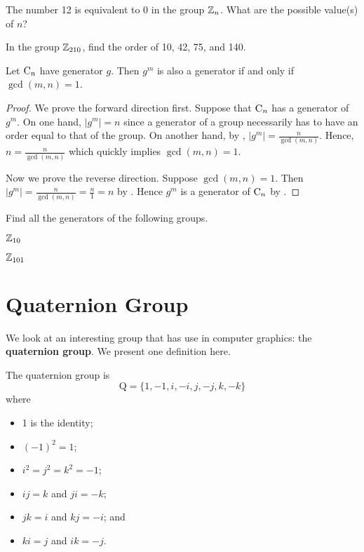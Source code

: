 \begin{exercise}
    The number 12 is equivalent to 0 in the group $\mathbb{Z}_n$. What are the possible value(s) of $n$?
\end{exercise}
\begin{exercise}
    In the group $\mathbb{Z}_{210}$, find the order of 10, 42, 75, and 140.
\end{exercise}

\begin{corollary}\label{corollary-element-in-cyclic-group-is-generator-iff-gcd-is-1}
    Let $\mathrm{C}_{n}$ have generator $g$. Then $g^m$ is also a generator if and only if $\gcd(m, n) = 1$.
\end{corollary}
\begin{proof}
    We prove the forward direction first. Suppose that $\mathrm{C}_{n}$ has a generator of $g^m$. On one hand, $|g^m| = n$ since a generator of a group necessarily has to have an order equal to that of the group. On another hand, by , $|g^m| = \frac{n}{\gcd(m, n)}$. Hence, $n = \frac{n}{\gcd(m, n)}$ which quickly implies $\gcd(m, n) = 1$.

    Now we prove the reverse direction. Suppose $\gcd(m,n) = 1$. Then $|g^m| = \frac{n}{\gcd(m,n)} = \frac{n}{1} = n$ by . Hence $g^m$ is a generator of $\mathrm{C}_{n}$ by .
\end{proof}

\begin{exercise}
    Find all the generators of the following groups.
    \begin{partquestions}{\alph*}
        \item $\mathbb{Z}_{10}$
        \item $\mathbb{Z}_{101}$
    \end{partquestions}
\end{exercise}

\section{Quaternion Group}
We look at an interesting group that has use in computer graphics: the \textbf{quaternion group}. We present one definition here.
\begin{definition}\label{definition-quaternion-group}
    The quaternion group is
    \[
            \mathrm{Q} = \{1, -1, i, -i, j, -j, k, -k\}
    \]
    where
    \begin{multicols}{2}
        \begin{itemize}
            \item 1 is the identity;
            \item $(-1)^2 = 1$;
            \item $i^2 = j^2 = k^2 = -1$;
            \item $ij = k$ and $ji = -k$;
            \item $jk = i$ and $kj = -i$; and
            \item $ki = j$ and $ik = -j$.
        \end{itemize}
    \end{multicols}
\end{definition}

